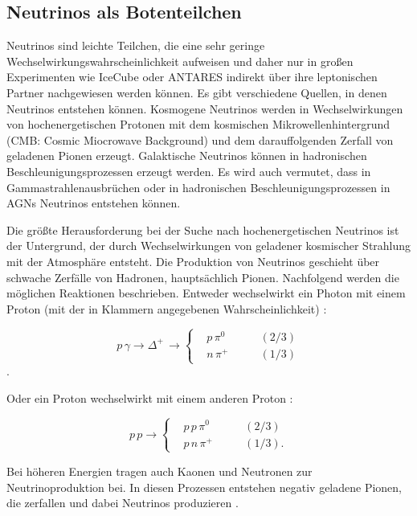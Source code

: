 \subsection{Neutrinos als Botenteilchen}
Neutrinos sind leichte Teilchen, die eine sehr geringe Wechselwirkungswahrscheinlichkeit aufweisen und daher nur in großen Experimenten wie IceCube \cite{Icecube} oder ANTARES \cite{ANTARES} indirekt über ihre leptonischen Partner nachgewiesen werden können.
Es gibt verschiedene Quellen, in denen Neutrinos entstehen können.
Kosmogene Neutrinos werden in Wechselwirkungen von hochenergetischen Protonen mit dem kosmischen Mikrowellenhintergrund (CMB: Cosmic Miocrowave Background) und dem darauffolgenden Zerfall von geladenen Pionen erzeugt.
Galaktische Neutrinos können in hadronischen Beschleunigungsprozessen erzeugt werden.
Es wird auch vermutet, dass in Gammastrahlenausbrüchen oder in hadronischen Beschleunigungsprozessen in AGNs Neutrinos entstehen können.

Die größte Herausforderung bei der Suche nach hochenergetischen Neutrinos ist der Untergrund, der durch Wechselwirkungen von geladener kosmischer Strahlung mit der Atmosphäre entsteht.
Die Produktion von Neutrinos geschieht über schwache Zerfälle von Hadronen, hauptsächlich Pionen.
Nachfolgend werden die möglichen Reaktionen beschrieben.
Entweder wechselwirkt ein Photon mit einem Proton (mit der in Klammern angegebenen Wahrscheinlichkeit) \cite{DissBecker}:

\begin{equation*}
p\, \gamma \rightarrow \Delta^+ \, \rightarrow	
\left\{
\begin{aligned}
& p \, \pi^0 & \qquad (2/3) \\
& n \, \pi^+ & \qquad (1/3)
\end{aligned}
\right.
\end{equation*}.

Oder ein Proton wechselwirkt mit einem anderen Proton \cite{DissBecker}:

\begin{equation*}
p \, p \rightarrow
\left\{
\begin{aligned}
& p \, p \, \pi^0 & \qquad (2/3) \\
& p \, n \, \pi^+ & \qquad (1/3).
\end{aligned}
\right.
\end{equation*}

Bei höheren Energien tragen auch Kaonen und Neutronen zur Neutrinoproduktion bei.
In diesen Prozessen entstehen negativ geladene Pionen, die zerfallen und dabei Neutrinos produzieren \cite{NeutrinoOszillation}.

